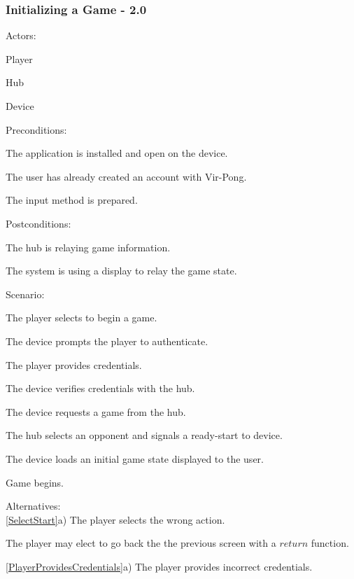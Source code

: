 \documentclass[12pt]{article}
\newenvironment{itemize*}%
  {\begin{itemize}%
  	\setlength{\parsep}{0pt}
    \setlength{\itemsep}{0pt}%
    \setlength{\parskip}{0pt}}%
  {\end{itemize}}
\newenvironment{enumerate*}%
  {\begin{enumerate}%
  	\setlength{\parsep}{0pt}
    \setlength{\itemsep}{0pt}%
    \setlength{\parskip}{0pt}}%
  {\end{enumerate}}
\begin{document}
\subsubsection*{Initializing a Game - 2.0}
Actors:
\begin{itemize*}
\item Player
\item Hub
\item Device
\end{itemize*}
Preconditions:
\begin{itemize*}
\item The application is installed and open on the device.
\item The user has already created an account with Vir-Pong.
\item The input method is prepared.
\end{itemize*}
Postconditions:
\begin{itemize*}
\item The hub is relaying game information.
\item The system is using a display to relay the game state.
\end{itemize*}
Scenario:
\begin{enumerate*}
\item \label{SelectStart}The player selects to begin a game.
\item \label{SystemPromptsAuthentication}The device prompts the player to authenticate.
\item \label{PlayerProvidesCredentials}The player provides credentials.
\item \label{SystemVerifies}The device verifies credentials with the hub.
\item \label{SystemRequestsGame}The device requests a game from the hub.
\item \label{HubSelectsOpponent}The hub selects an opponent and signals a ready-start to device.
\item \label{LoadGameState}The device loads an initial game state displayed to the user.
\item Game begins.
\end{enumerate*}
Alternatives:\\
\ref{SelectStart}a) The player selects the wrong action.
\begin{enumerate*}
\item The player may elect to go back the the previous screen with a $return$ function.
\end{enumerate*}
\ref{PlayerProvidesCredentials}a) The player provides incorrect credentials.
\end{document}
